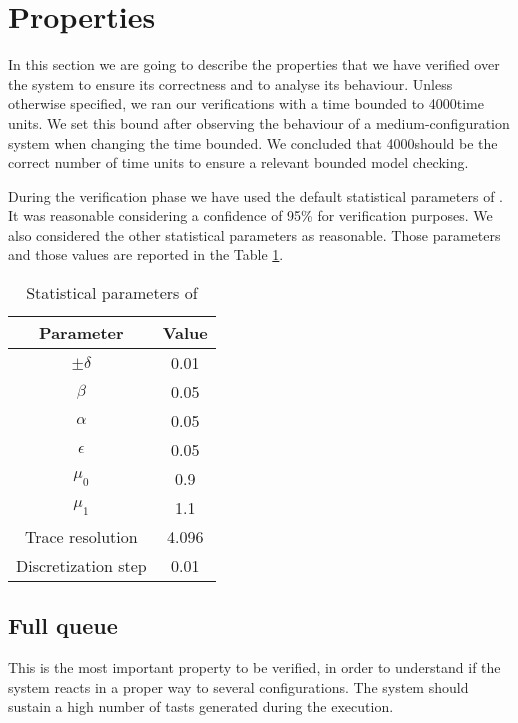 \newcommand{\timebound}{4000}
\newcommand{\query}{[INSERIRE LA QUERY]}

\section{Properties}
In this section we are going to describe the properties that we have verified over the system to ensure its correctness and to analyse its behaviour. Unless otherwise specified, we ran our verifications with a time bounded to \timebound \space time units. We set this bound after observing the behaviour of a medium-configuration system when changing the time bounded. We concluded that \timebound \space should be the correct number of time units to ensure a relevant bounded model checking.

During the verification phase we have used the default statistical parameters of \UPPAAL. It was reasonable considering a confidence of 95\% for verification purposes. We also considered the other statistical parameters as reasonable. Those parameters and those values are reported in the Table \ref{tab:statparam}.

\begin{table}[h]
    \centering
        \begin{tabular}{|c c|} 
            \hline
            Parameter & Value \\ [0.5ex] 
            \hline\hline
            $\pm\delta$ & 0.01 \\
            $\beta$ & 0.05 \\
            $\alpha$ & 0.05 \\
            $\epsilon$ & 0.05 \\
            $\mu_0$ & 0.9 \\
            $\mu_1$ & 1.1 \\
            Trace resolution & 4.096 \\
            Discretization step & 0.01 \\ [0.5ex] 
            \hline
        \end{tabular}
        \caption{Statistical parameters of \UPPAAL}
        \label{tab:statparam}
\end{table}

\subsection{Full queue}
This is the most important property to be verified, in order to understand if the system reacts in a proper way to several configurations. The system should sustain a high number of tasts generated during the execution.


